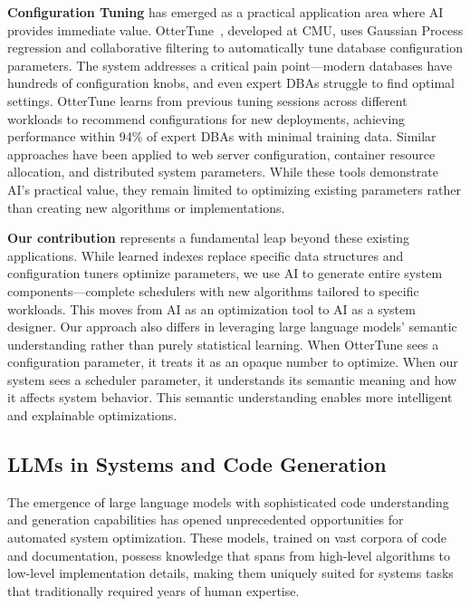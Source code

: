 \textbf{Configuration Tuning} has emerged as a practical application area where AI provides immediate value. OtterTune~\cite{vanaken2017ottertune}, developed at CMU, uses Gaussian Process regression and collaborative filtering to automatically tune database configuration parameters. The system addresses a critical pain point—modern databases have hundreds of configuration knobs, and even expert DBAs struggle to find optimal settings. OtterTune learns from previous tuning sessions across different workloads to recommend configurations for new deployments, achieving performance within 94\% of expert DBAs with minimal training data. Similar approaches have been applied to web server configuration, container resource allocation, and distributed system parameters. While these tools demonstrate AI's practical value, they remain limited to optimizing existing parameters rather than creating new algorithms or implementations.

\textbf{Our contribution} represents a fundamental leap beyond these existing applications. While learned indexes replace specific data structures and configuration tuners optimize parameters, we use AI to generate entire system components—complete schedulers with new algorithms tailored to specific workloads. This moves from AI as an optimization tool to AI as a system designer. Our approach also differs in leveraging large language models' semantic understanding rather than purely statistical learning. When OtterTune sees a configuration parameter, it treats it as an opaque number to optimize. When our system sees a scheduler parameter, it understands its semantic meaning and how it affects system behavior. This semantic understanding enables more intelligent and explainable optimizations.

\subsection{LLMs in Systems and Code Generation}

The emergence of large language models with sophisticated code understanding and generation capabilities has opened unprecedented opportunities for automated system optimization. These models, trained on vast corpora of code and documentation, possess knowledge that spans from high-level algorithms to low-level implementation details, making them uniquely suited for systems tasks that traditionally required years of human expertise.

